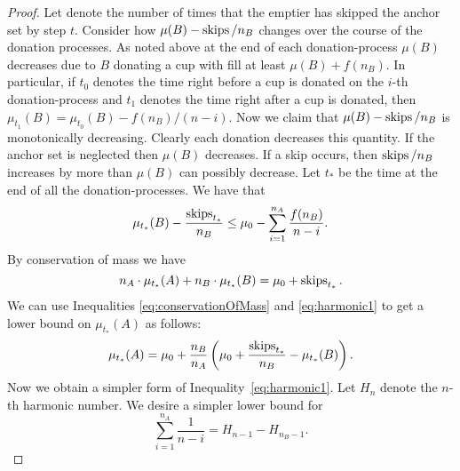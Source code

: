 \begin{proof}
  Let  denote the number of times that the
  emptier has skipped the anchor set by step $t$. Consider how
  $\mu(B) - \operatorname{\text{\textup{skips}}}/n_B$ changes over the course of the donation
  processes. As noted above at the end of each donation-process
  $\mu(B)$ decreases due to $B$ donating a cup with fill at least
  $\mu(B) + f(n_B)$. In particular, if $t_0$ denotes the time
  right before a cup is donated on the $i$-th donation-process
  and $t_1$ denotes the time right after a cup is donated, then
  $\mu_{t_1}(B) = \mu_{t_0}(B) - f(n_B) / (n-i)$. Now we claim that
  $\mu(B) - \operatorname{\text{\textup{skips}}}/n_B$ is monotonically decreasing. Clearly each
  donation decreases this quantity. If the anchor set is
  neglected then $\mu(B)$ decreases. If a skip occurs, then
  $\operatorname{\text{\textup{skips}}}/n_B$ increases by more than $\mu(B)$ can possibly
  decrease. Let $t_*$ be the time at the end of all the
  donation-processes. We have that 
  \begin{equation}
    \label{eq:harmonic1}
    \mu_{t_*}(B) - \frac{\operatorname{\text{\textup{skips}}}_{t_*}}{n_B} \le \mu_0 - \sum_{i=1}^{n_A}\frac{f(n_B)}{n-i}.
  \end{equation}
  By conservation of mass we have 
  \begin{equation}
    \label{eq:conservationOfMass}
    n_A\cdot \mu_{t_*}(A) + n_B\cdot \mu_{t_*}(B) = \mu_0 + \operatorname{\text{\textup{skips}}}_{t_*}.
  \end{equation}
  We can use Inequalities \eqref{eq:conservationOfMass} and
  \eqref{eq:harmonic1} to get a lower bound on $\mu_{t_*}(A)$ as
  follows:
  \begin{equation}
    \label{eq:lowerboundingAharmonic}
    \mu_{t_*}(A) = \mu_0 + \frac{n_B}{n_A}\left( \mu_0 +
    \frac{\operatorname{\text{\textup{skips}}}_{t_*}}{n_B} - \mu_{t_*}(B) \right).
  \end{equation}
  Now we obtain a simpler form of
  Inequality~\eqref{eq:harmonic1}. Let $H_n$ denote the $n$-th
  harmonic
  number. We desire a simpler lower bound for 
  $$\sum_{i=1}^{n_A} \frac{1}{n-i} = H_{n-1}-H_{n_B-1}.$$


\end{proof}
